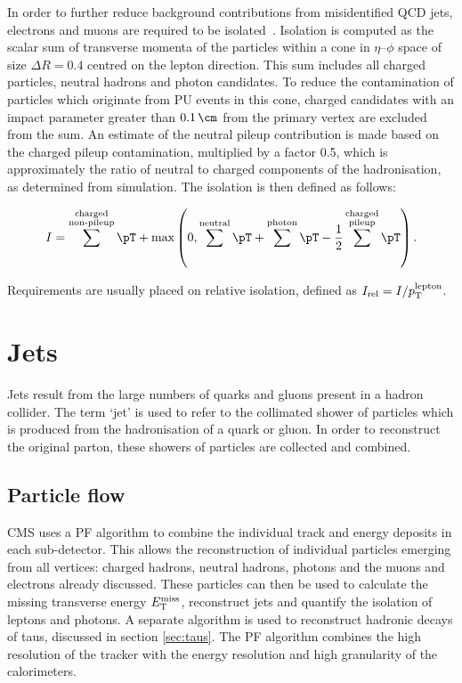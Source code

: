 In order to further reduce background contributions from misidentified QCD jets,
electrons and muons are required to be isolated~\cite{CMS:2013hoa,MuonReco}. 
Isolation is computed as the scalar sum of transverse momenta of the particles within a cone in
$\eta$--$\phi$ space of size $\Delta R = 0.4$ centred on the lepton direction. 
This sum includes all charged particles, neutral hadrons and photon candidates. 
To reduce the contamination of particles which originate from \ac{PU} events 
in this cone, charged  candidates with an impact parameter greater than 
$0.1\,\cm$ from the primary vertex are excluded from the sum. An estimate of the 
neutral pileup contribution is made based on the charged pileup contamination,
multiplied by a factor 0.5, which is approximately the ratio of neutral to
charged components of the hadronisation, as determined from simulation.   
The isolation is then defined as follows:

\begin{equation}
I = \sum^{\substack{\text{charged} \\ \text{non-pileup}}}\pT +
\text{max}\left(0,\sum^{\text{neutral}}\pT+\sum^{\text{photon}}\pT-\frac{1}{2}\sum^{\substack{\text{charged}
\\ \text{pileup}}}\pT\right).
\label{eq:leptonisolation}
\end{equation}

Requirements are usually placed on relative isolation, defined as
$I_{\text{rel}} = I / p_{\mathrm{T}}^{\text{lepton}}$. 

\section{Jets}
\label{sec:jets}

Jets result from the large numbers of quarks and gluons present in a hadron
collider. The term `jet' is used to refer to the collimated shower of particles
which is produced from the hadronisation of a quark or gluon. In order to
reconstruct the original parton, these showers of particles are collected
and combined. 

\subsection{Particle flow}
\label{sec:particleflow}

CMS uses a \ac{PF} \cite{CMS-PAS-PFT-09-001,CMS-PAS-PFT-10-001,CMS-PAS-PFT-10-002} 
algorithm to combine the individual track and energy deposits in each sub-detector. 
This allows the reconstruction of individual particles emerging from all vertices: charged
hadrons, neutral hadrons, photons and the muons and electrons already discussed.
These particles can then be 
used to calculate the missing transverse energy $E_{\mathrm{T}}^{\text{miss}}$,
reconstruct jets and quantify the isolation of leptons and photons. A separate
algorithm is used to reconstruct hadronic decays of taus, discussed in section
\ref{sec:taus}. The \ac{PF} algorithm combines the high resolution of
the tracker with the energy resolution and high granularity of the calorimeters.


